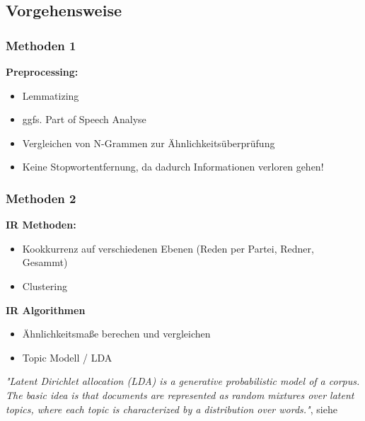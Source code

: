 \documentclass[11pt, a4paper]{beamer}
\begin{document}
\subsection{Vorgehensweise}
\begin{frame}
\frametitle{Methoden 1}
\textbf{Preprocessing:}
\begin{itemize}
\item Lemmatizing
\item ggfs. Part of Speech Analyse  
\item Vergleichen von N-Grammen zur Ähnlichkeitsüberprüfung
\item Keine Stopwortentfernung, da dadurch Informationen verloren gehen!
\end{itemize}
\end{frame}

\begin{frame}
\frametitle{Methoden 2}
\textbf{IR Methoden:}
\begin{itemize}
\item Kookkurrenz auf verschiedenen Ebenen (Reden per Partei, Redner, Gesammt)
\item Clustering
\end{itemize}
\textbf{IR Algorithmen}
\begin{itemize}
\item Ähnlichkeitsmaße berechen und vergleichen 
\item Topic Modell / LDA 
\end{itemize}
\textit {"Latent Dirichlet allocation (LDA) is a generative probabilistic
	model of a corpus. The basic idea is that documents are represented as
 	random mixtures over latent topics, where each topic is characterized by a
 	distribution over words."}, siehe \cite{blatent}
%  	
\end{frame} 
\end{document}
